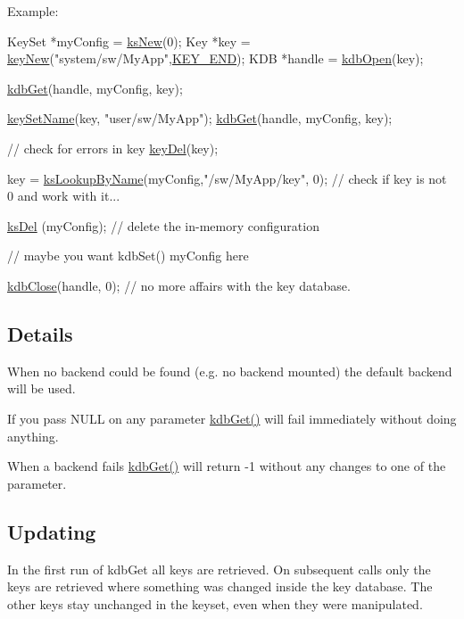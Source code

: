 \begin{DoxyParagraph}{Example\-:}

\begin{DoxyCode}
KeySet *myConfig = \hyperlink{group__keyset_ga671e1aaee3ae9dc13b4834a4ddbd2c3c}{ksNew}(0);
Key *key = \hyperlink{group__key_gad23c65b44bf48d773759e1f9a4d43b89}{keyNew}(\textcolor{stringliteral}{"system/sw/MyApp"},\hyperlink{group__key_gga91fb3178848bd682000958089abbaf40aa8adb6fcb92dec58fb19410eacfdd403}{KEY\_END});
KDB *handle = \hyperlink{group__kdb_ga6808defe5870f328dd17910aacbdc6ca}{kdbOpen}(key);

\hyperlink{group__kdb_ga28e385fd9cb7ccfe0b2f1ed2f62453a1}{kdbGet}(handle, myConfig, key);

\hyperlink{group__keyname_ga7699091610e7f3f43d2949514a4b35d9}{keySetName}(key, \textcolor{stringliteral}{"user/sw/MyApp"});
\hyperlink{group__kdb_ga28e385fd9cb7ccfe0b2f1ed2f62453a1}{kdbGet}(handle, myConfig, key);

\textcolor{comment}{// check for errors in key}
\hyperlink{group__key_ga3df95bbc2494e3e6703ece5639be5bb1}{keyDel}(key);

key = \hyperlink{group__keyset_gad2e30fb6d4739d917c5abb2ac2f9c1a1}{ksLookupByName}(myConfig,\textcolor{stringliteral}{"/sw/MyApp/key"}, 0);
\textcolor{comment}{// check if key is not 0 and work with it...}

\hyperlink{group__keyset_ga27e5c16473b02a422238c8d970db7ac8}{ksDel} (myConfig); \textcolor{comment}{// delete the in-memory configuration}


\textcolor{comment}{// maybe you want kdbSet() myConfig here}

\hyperlink{group__kdb_gadb54dc9fda17ee07deb9444df745c96f}{kdbClose}(handle, 0); \textcolor{comment}{// no more affairs with the key database.}
\end{DoxyCode}

\end{DoxyParagraph}
\hypertarget{group__kdb_kdbgetdetail}{}\subsection{Details}\label{group__kdb_kdbgetdetail}
When no backend could be found (e.\-g. no backend mounted) the default backend will be used.

If you pass N\-U\-L\-L on any parameter \hyperlink{group__kdb_ga28e385fd9cb7ccfe0b2f1ed2f62453a1}{kdb\-Get()} will fail immediately without doing anything.

When a backend fails \hyperlink{group__kdb_ga28e385fd9cb7ccfe0b2f1ed2f62453a1}{kdb\-Get()} will return -\/1 without any changes to one of the parameter.\hypertarget{group__kdb_kdbgetupdate}{}\subsection{Updating}\label{group__kdb_kdbgetupdate}
In the first run of kdb\-Get all keys are retrieved. On subsequent calls only the keys are retrieved where something was changed inside the key database. The other keys stay unchanged in the keyset, even when they were manipulated.

